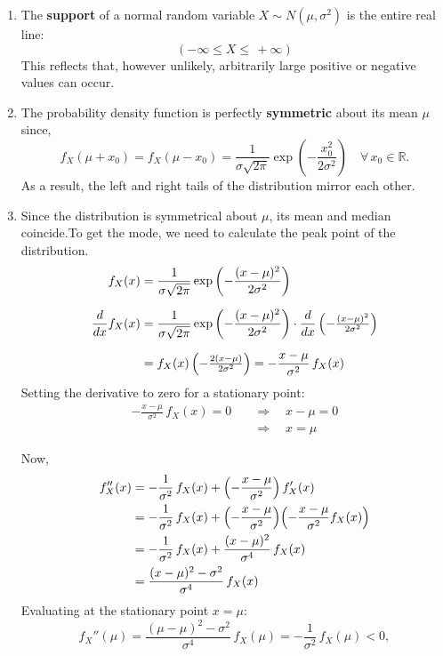 \documentclass[twoside]{book}
\begin{document}
\begin{enumerate}
  \item The \textbf{support} of a normal random variable \(X \sim N(\mu,\sigma^2)\) is the entire real line:
    \[
	(-\infty \leq X \leq\,+\infty)
    \]
    This reflects that, however unlikely, arbitrarily large positive or negative values can occur.

  \item The probability density function is perfectly \textbf{symmetric} about its mean \(\mu\) since,
    \[
      f_X(\mu + x_0) = f_X(\mu - x_0) =  \frac{1}{\sigma\sqrt{2\pi }} \exp\left( -\frac{x_0^2}{2\sigma^2} \right)
      \quad\forall\,x_0\in\mathbb{R}.
    \]
    As a result, the left and right tails of the distribution mirror each other.

  \item Since the distribution is symmetrical about $\mu$, its mean and median coincide.To get the mode, we need to calculate the peak point of the distribution.
  \begin{align*}
  f_X(x) &= \frac{1}{\sigma\sqrt{2\pi}} \exp\left( -\frac{(x-\mu)^2}{2\sigma^2}\right)  \\[6pt]
  \frac{d}{dx}f_X(x)
  &= \frac{1}{\sigma\sqrt{2\pi}} \exp\left( -\frac{(x-\mu)^2}{2\sigma^2}\right)
     \cdot \frac{d}{dx}\left( -\tfrac{(x-\mu)^2}{2\sigma^2}\right)  \\[6pt]
  &= f_X(x)\,\Bigl(-\tfrac{2(x-\mu)}{2\sigma^2}\Bigr)
  = -\frac{x-\mu}{\sigma^2}\,f_X(x)
  \end{align*}
  Setting the derivative to zero for a stationary point:
  \begin{align*}
  -\frac{x-\mu}{\sigma^2}\,f_X(x) = 0
  \quad &\Longrightarrow\quad x - \mu = 0 \\[4pt]
  &\Longrightarrow\quad x = \mu
  \end{align*}

  Now,
  \begin{align*}
  f_X''(x)
  &= -\frac{1}{\sigma^2}\,f_X(x)
     + \Bigl(-\frac{x-\mu}{\sigma^2}\Bigr)\,f_X'(x)
  \\
  &= -\frac{1}{\sigma^2}\,f_X(x)
     + \Bigl(-\frac{x-\mu}{\sigma^2}\Bigr)\Bigl(-\frac{x-\mu}{\sigma^2}f_X(x)\Bigr)
  \\
  &= -\frac{1}{\sigma^2}\,f_X(x)
     + \frac{(x-\mu)^2}{\sigma^4}\,f_X(x)
  \\
  &= \frac{(x-\mu)^2 - \sigma^2}{\sigma^4}\,f_X(x)
  \end{align*}
  Evaluating at the stationary point \(x=\mu\):
  \[
  f_X''(\mu)
  = \frac{(\mu-\mu)^2 - \sigma^2}{\sigma^4}\,f_X(\mu)
  = -\frac{1}{\sigma^2}\,f_X(\mu)
  < 0,
  \]


\end{enumerate}
\end{document}
